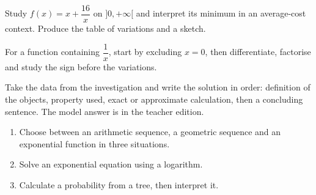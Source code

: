 \begin{activite}
Study $f(x)=x+\dfrac{16}{x}$ on $]0,+\infty[$ and interpret its minimum in an average-cost context. Produce the table of variations and a sketch.
\begin{center}\end{center}
\end{activite}

\begin{traceecrite}For a function containing $\dfrac1x$, start by excluding $x=0$, then differentiate, factorise and study the sign before the variations.\end{traceecrite}

\begin{exemple}
Take the data from the investigation and write the solution in order: definition of the objects, property used, exact or approximate calculation, then a concluding sentence. The model answer is in the teacher edition.
\end{exemple}

\begin{exercice}[-- essential]
\begin{enumerate}\item Choose between an arithmetic sequence, a geometric sequence and an exponential function in three situations.\item Solve an exponential equation using a logarithm.\item Calculate a probability from a tree, then interpret it.\end{enumerate}
\end{exercice}


